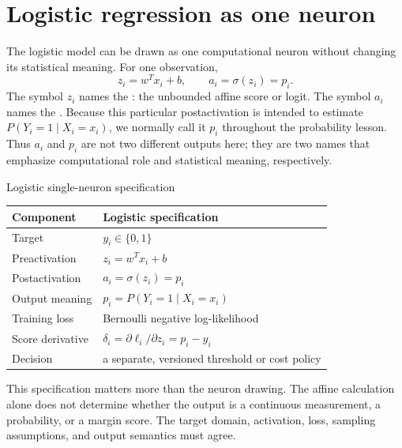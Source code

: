 
\section{Logistic regression as one neuron}

The logistic model can be drawn as one computational neuron without changing
its statistical meaning. For one observation,
\[
z_i=w^Tx_i+b,
\qquad
a_i=\sigma(z_i)=p_i.
\]
The symbol $z_i$ names the : the unbounded affine score or
logit. The symbol $a_i$ names the . Because this particular
postactivation is intended to estimate $P(Y_i=1\mid X_i=x_i)$, we normally call
it $p_i$ throughout the probability lesson. Thus $a_i$ and $p_i$ are not two
different outputs here; they are two names that emphasize computational role
and statistical meaning, respectively.

\begin{definitionbox}{Logistic single-neuron specification}
\begin{center}
\begin{tabular}{@{}ll@{}}
\toprule
Component & Logistic specification \\
\midrule
Target & $y_i\in\{0,1\}$ \\
Preactivation & $z_i=w^Tx_i+b$ \\
Postactivation & $a_i=\sigma(z_i)=p_i$ \\
Output meaning & $p_i=P(Y_i=1\mid X_i=x_i)$ \\
Training loss & Bernoulli negative log-likelihood \\
Score derivative & $\delta_i=\partial\ell_i/\partial z_i=p_i-y_i$ \\
Decision & a separate, versioned threshold or cost policy \\
\bottomrule
\end{tabular}
\end{center}
\end{definitionbox}

This specification matters more than the neuron drawing. The affine
calculation alone does not determine whether the output is a continuous
measurement, a probability, or a margin score. The target domain, activation,
loss, sampling assumptions, and output semantics must agree.

